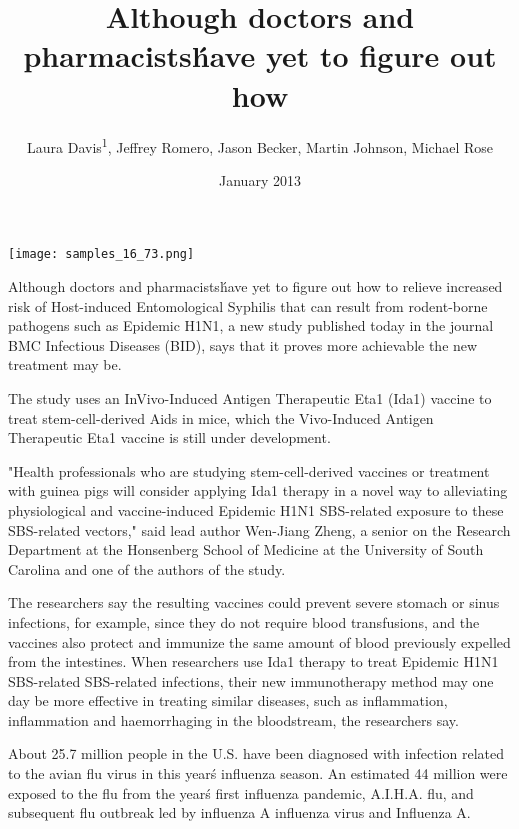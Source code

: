 \documentclass{article}
\title{Although doctors and pharmacists\' have yet to figure out how}
\author{Laura Davis\textsuperscript{1},  Jeffrey Romero,  Jason Becker,  Martin Johnson,  Michael Rose}
\affil{\textsuperscript{1}National Institute of Technology Rourkela}
\date{January 2013}
\begin{document}
\maketitle

\begin{center}
\begin{minipage}{0.75\linewidth}
\texttt{[image: samples\_16\_73.png]}
\end{minipage}
\end{center}

Although doctors and pharmacists\' have yet to figure out how to relieve increased risk of Host-induced Entomological Syphilis that can result from rodent-borne pathogens such as Epidemic H1N1, a new study published today in the journal BMC Infectious Diseases (BID), says that it proves more achievable the new treatment may be.

The study uses an InVivo-Induced Antigen Therapeutic Eta1 (Ida1) vaccine to treat stem-cell-derived Aids in mice, which the Vivo-Induced Antigen Therapeutic Eta1 vaccine is still under development.

"Health professionals who are studying stem-cell-derived vaccines or treatment with guinea pigs will consider applying Ida1 therapy in a novel way to alleviating physiological and vaccine-induced Epidemic H1N1 SBS-related exposure to these SBS-related vectors," said lead author Wen-Jiang Zheng, a senior on the Research Department at the Honsenberg School of Medicine at the University of South Carolina and one of the authors of the study.

The researchers say the resulting vaccines could prevent severe stomach or sinus infections, for example, since they do not require blood transfusions, and the vaccines also protect and immunize the same amount of blood previously expelled from the intestines. When researchers use Ida1 therapy to treat Epidemic H1N1 SBS-related SBS-related infections, their new immunotherapy method may one day be more effective in treating similar diseases, such as inflammation, inflammation and haemorrhaging in the bloodstream, the researchers say.

About 25.7 million people in the U.S. have been diagnosed with infection related to the avian flu virus in this year\'s influenza season. An estimated 44 million were exposed to the flu from the year\'s first influenza pandemic, A.I.H.A. flu, and subsequent flu outbreak led by influenza A influenza virus and Influenza A.
\end{document}
